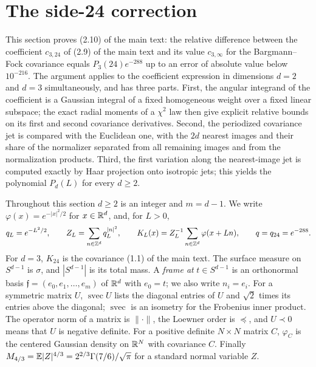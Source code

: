\section{The side-24 correction}\label{sec:correction}

This section proves (2.10) of the main text: the relative difference between the coefficient $c_{3,24}$ of (2.9) of the main text and its value $c_{3,\infty}$ for the Bargmann--Fock covariance equals $P_3(24)e^{-288}$ up to an error of absolute value below $10^{-216}$. The argument applies to the coefficient expression in dimensions $d=2$ and $d=3$ simultaneously, and has three parts. First, the angular integrand of the coefficient is a Gaussian integral of a fixed homogeneous weight over a fixed linear subspace; the exact radial moments of a $\chi^2$ law then give explicit relative bounds on its first and second covariance derivatives. Second, the periodized covariance jet is compared with the Euclidean one, with the $2d$ nearest images and their share of the normalizer separated from all remaining images and from the normalization products. Third, the first variation along the nearest-image jet is computed exactly by Haar projection onto isotropic jets; this yields the polynomial $P_d(L)$ for every $d\ge2$.

\begin{convention}\label{conv:correction-notation}
Throughout this section $d\ge2$ is an integer and $m=d-1$. We write $\varphi(x)=e^{-|x|^2/2}$ for $x\in\mathbb R^d$, and, for $L>0$,
\[
q_L=e^{-L^2/2},\qquad Z_L=\sum_{n\in\mathbb Z^d}q_L^{|n|^2},\qquad K_L(x)=Z_L^{-1}\sum_{n\in\mathbb Z^d}\varphi(x+Ln),\qquad q=q_{24}=e^{-288}.
\]
For $d=3$, $K_{24}$ is the covariance (1.1) of the main text. The surface measure on $S^{d-1}$ is $\sigma$, and $|S^{d-1}|$ is its total mass. A \emph{frame at} $t\in S^{d-1}$ is an orthonormal basis $\mathfrak f=(e_0,e_1,\dots,e_m)$ of $\mathbb R^d$ with $e_0=t$; we also write $n_i=e_i$. For a symmetric matrix $U$, $\operatorname{svec}U$ lists the diagonal entries of $U$ and $\sqrt2$ times its entries above the diagonal; $\operatorname{svec}$ is an isometry for the Frobenius inner product. The operator norm of a matrix is $\|\cdot\|$, the Loewner order is $\preccurlyeq$, and $U\prec0$ means that $U$ is negative definite. For a positive definite $N\times N$ matrix $C$, $\varphi_C$ is the centered Gaussian density on $\mathbb R^N$ with covariance $C$. Finally $M_{4/3}=\mathbb E|Z|^{4/3}=2^{2/3}\Gamma(7/6)/\sqrt\pi$ for a standard normal variable $Z$.
\end{convention}

